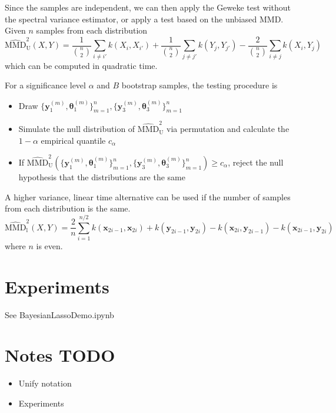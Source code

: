 \documentclass{article}
\begin{document}
Since the samples are independent, we can then apply the Geweke test without the spectral variance estimator, or apply a test based on the unbiased MMD. Given $n$ samples from each distribution
\begin{equation}
\widehat{\mathrm{MMD}}_{\mathrm{U}}^{2}(X, Y) = \frac{1}{{n\choose 2}} \sum_{i \neq i'} k\left(X_{i}, X_{i'}\right)+\frac{1}{{n\choose 2}} \sum_{j \neq j'} k\left(Y_{j}, Y_{j'}\right)-\frac{2}{{n\choose 2}} \sum_{i \neq j} k\left(X_{i}, Y_{j}\right)
\end{equation}
which can be computed in quadratic time.

For a significance level $\alpha$ and $B$ bootstrap samples, the testing procedure is
\begin{itemize}
    \item Draw $\{\mathbf{y}_{1}^{(m)}, \mathbf{\theta}_{1}^{(m)}\}_{m=1}^{n}, \{\mathbf{y}_{3}^{(m)}, \mathbf{\theta}_{3}^{(m)}\}_{m=1}^{n}$
    \item Simulate the null distribution of $\widehat{\mathrm{MMD}}_{\mathrm{U}}^{2}$ via permutation and calculate the $1-\alpha$ empirical quantile $c_{\alpha}$
    \item If $\widehat{\mathrm{MMD}}_{\mathrm{U}}^{2}(\{\mathbf{y}_{1}^{(m)}, \mathbf{\theta}_{1}^{(m)}\}_{m=1}^{n}, \{\mathbf{y}_{3}^{(m)}, \mathbf{\theta}_{3}^{(m)}\}_{m=1}^{n}) \geq c_{\alpha}$, reject the null hypothesis that the distributions are the same
\end{itemize}

 A higher variance, linear time alternative can be used if the number of samples from each distribution is the same.
\begin{equation}
\widehat{\mathrm{MMD}}_{\mathrm{l}}^{2}(X, Y) = \frac{2}{n} \sum_{i=1}^{n/2} k(\mathbf{x}_{2i-1}, \mathbf{x}_{2i}) + k(\mathbf{y}_{2i-1}, \mathbf{y}_{2i}) - k(\mathbf{x}_{2i}, \mathbf{y}_{2i-1}) - k(\mathbf{x}_{2i-1}, \mathbf{y}_{2i})
\end{equation}
where $n$ is even.

\section{Experiments}
See BayesianLassoDemo.ipynb

\section{Notes TODO}
\begin{itemize}
    \item Unify notation
    \item Experiments
\end{itemize}
\end{document}
